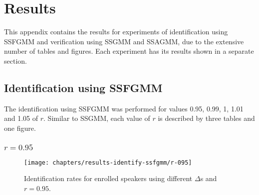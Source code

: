 \chapter{Results}
\label{apx:results}

This appendix contains the results for experiments of identification using SSFGMM and verification using SSGMM and SSAGMM, due to the extensive number of tables and figures. Each experiment has its results shown in a separate section.

\section{Identification using SSFGMM}
\label{sec:results-identify-ssfgmm}

The identification using SSFGMM was performed for values 0.95, 0.99, 1, 1.01 and 1.05 of $r$. Similar to SSGMM, each value of $r$ is described by three tables and one figure.

\subsection{$r = 0.95$}





\newpage
\begin{figure}[ht]
    \centering
    \texttt{[image: chapters/results-identify-ssfgmm/r-095]}
    \caption{Identification rates for enrolled speakers using different $\Delta$s and $r = 0.95$.}
    \label{fig:r-095}
\end{figure}